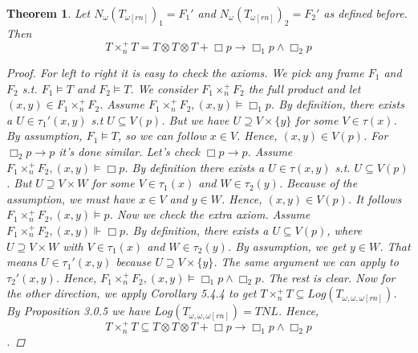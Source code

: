 \documentclass[12pt, a4paper]{scrartcl}
\newtheorem{theorem}[definition]{Theorem}
\begin{document}
    \begin{theorem}
        Let $N_\omega(T_{\omega[rn]})_1 = F_1'$ and $N_\omega(T_{\omega[rn]})_2 = F_2'$ as defined before. Then 
        $$T \times^+_n T = T \otimes T \otimes T + \Box p \rightarrow \Box_1 p \land \Box_2 p$$

        \begin{proof}
            For left to right it is easy to check the axioms. We pick any frame $F_1$ and $F_2$ s.t.
            $F_1 \vDash T$ and $F_2 \vDash T$. We consider $F_1 \times^+_n F_2$ the full product and let $(x,y) \in F_1 \times^+_n F_2$. \newline
            Assume $F_1 \times^+_n F_2,(x,y) \vDash \Box_1 p$. By definition, there exists a $U \in \tau_1'(x,y)$ s.t $U \subseteq V(p)$.
            But we have $U \supseteq V \times \{y\}$ for some $V \in \tau(x)$. By assumption, $F_1 \vDash T$, so we can follow $x \in V$. Hence, $(x,y) \in V(p)$. For $\Box_2p \rightarrow p$ it's done similar. \newline Let's check $\Box p \rightarrow p$.
            Assume $F_1 \times^+_n F_2,(x,y) \vDash \Box p$. By definition there exists a $U \in \tau(x,y)$ s.t. $U \subseteq V(p)$. But $U \supseteq V \times W$ for some $V \in \tau_1(x)$ and $W \in \tau_2(y)$.
            Because of the assumption, we must have $x \in V$ and $y \in W$. Hence, $(x,y) \in V(p)$. It follows $F_1 \times^+_n F_2,(x,y) \vDash p$. \newline
            Now we check the extra axiom.  Assume $F_1 \times^+_n F_2,(x,y) \Vdash \Box p$. By definition, there exists a $U \subseteq V(p)$, where $U \supseteq V \times W$ with $V \in \tau_1(x)$ and $W \in \tau_2(y)$. By assumption, we get $y \in W$. That means $U \in \tau_1'(x,y)$ 
            because $U \supseteq V \times \{y\}$. The same argument we can apply to $\tau_2'(x,y)$. Hence, $F_1 \times^+_n F_2,(x,y) \vDash \Box_1 p \land \Box_2 p$. The rest is clear. \newline
            Now for the other direction, we apply Corollary 5.4.4 to get $T \times^+_n T \subseteq Log(T_{\omega,\omega,\omega[rn]})$. By Proposition 3.0.5 we have
            $Log(T_{\omega,\omega,\omega[rn]}) = TNL$. Hence, 
            $$T \times^+_n T \subseteq T \otimes T \otimes T + \Box p \rightarrow \Box_1 p \land \Box_2 p$$.
            

        \end{proof}
        
    \end{theorem}
\end{document}
